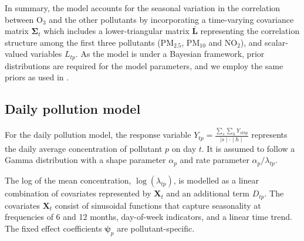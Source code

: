 \documentclass[
  12,
]{article}
\begin{document}
In summary, the model accounts for the seasonal variation in the
correlation between O\(_3\) and the other pollutants by incorporating a
time-varying covariance matrix \(\symbf{\Sigma}_t\) which includes a
lower-triangular matrix \(\symbf{\bar{L}}\) representing the correlation
structure among the first three pollutants (PM\(_{2.5}\), PM\(_{10}\)
and NO\(_2\)), and scalar-valued variables \(L_{tp}\). As the model is
under a Bayesian framework, prior distributions are required for the
model parameters, and we employ the same priors as used in
\textcite{Huang2022}.

\hypertarget{daily-pollution-model}{%
\subsection{Daily pollution model}\label{daily-pollution-model}}

For the daily pollution model, the response variable
\(Y_{tp}=\frac{\sum_s\sum_h Y_{sthp}}{\mid s \mid \cdot \mid h \mid}\)
represents the daily average concentration of pollutant \(p\) on day
\(t\). It is assumed to follow a Gamma distribution with a shape
parameter \(\alpha_p\) and rate parameter \(\alpha_p/\lambda_{tp}\).

The log of the mean concentration, \(\log(\lambda_{tp})\), is modelled
as a linear combination of covariates represented by \(\symbf{X}_t\) and
an additional term \(D_{tp}\). The covariates \(\symbf{X}_t\) consist of
sinusoidal functions that capture seasonality at frequencies of 6 and 12
months, day-of-week indicators, and a linear time trend. The fixed
effect coefficients \(\symbf{\psi}_p\) are pollutant-specific.
\end{document}
